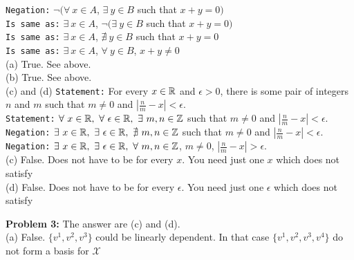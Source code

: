\documentclass[letterpaper]{article}
\begin{document}
\texttt{Negation:} $ \neg (\forall~x \in A$, $\exists~y \in B$   such that $x+y=0)$\\

\texttt{Is same as:} $ \exists~ x \in A$, $\neg (\exists~y \in B$  such that  $x+y = 0)$\\

\texttt{Is same as:} $ \exists~ x \in A$, $\nexists~y \in B$  such that  $x+y = 0$\\

\texttt{Is same as:} $ \exists~ x \in A$, $\forall~y \in B$,  $x+y\neq 0$\\


(a) True. See above.\\

(b) True.  See above. \\


(c) and (d)  \texttt{Statement:}  For every  $x\in \mathbb R$ and $\epsilon>0$, there is some pair of integers $n$ and $m$ such that $m\neq0$ and $|\frac{n}{m} -x| < \epsilon$. \\

\texttt{Statement:}  $\forall~x \in \mathbb R,~ \forall~\epsilon \in \mathbb R, ~\exists~ m,n \in \mathbb Z$ such that $m \neq 0$ and $|\frac{n}{m} -x| < \epsilon$. \\

\texttt{Negation:} $\exists~x \in \mathbb R,~ \exists~\epsilon \in \mathbb R, ~\nexists~ m,n \in \mathbb Z $ such that $m \neq 0$ and $|\frac{n}{m} -x| < \epsilon$. \\

\texttt{Negation:} $\exists~x \in \mathbb R,~ \exists~\epsilon \in \mathbb R, ~\forall~ m,n \in \mathbb Z $, $m \neq 0$, $|\frac{n}{m} -x| > \epsilon$. \\

(c) False. Does not have to be for every $x$. You need just one $x$ which does not satisfy\\

(d) False. Does not have to be for every $\epsilon$. You need just one $\epsilon$ which does not satisfy \\

\bigskip

\bigskip

\noindent \textbf{Problem 3:} The answer are (c) and (d). \\

(a) False. $\{v^1, v^2, v^3\}$ could be linearly dependent. In that case $\{v^1, v^2, v^3, v^4\}$ do not form a basis for $\mathcal X$ \\
\end{document}
